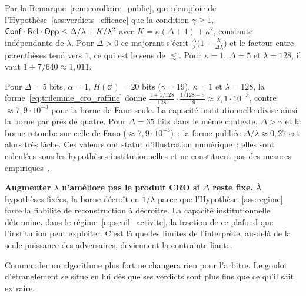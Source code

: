 \begin{sloppypar}
\begin{corollary}
\end{corollary}

\begin{Preuve}
Par la Remarque~\ref{rem:corollaire_publie}, qui n'emploie de
l'Hypoth\`ese~\ref{ass:verdicts_efficace} que la condition $\gamma \geq 1$,
$\mathsf{Conf} \cdot \mathsf{Rel} \cdot \mathsf{Opp} \leq \Delta/\lambda + K/\lambda^2$ avec
$K = \kappa(\Delta+1) + \kappa^2$, constante ind\'ependante de $\lambda$. Pour
$\Delta > 0$ ce majorant s'\'ecrit $\frac{\Delta}{\lambda}\bigl(1 + \frac{K}{\Delta\lambda}\bigr)$
et le facteur entre parenth\`eses tend vers $1$, ce qui est le sens de $\lesssim$.
Pour $\kappa = 1$, $\Delta = 5$ et $\lambda = 128$, il vaut
$1 + 7/640 \approx 1{,}011$.
\end{Preuve}

Pour $\Delta = 5$ bits, $\alpha = 1$, $H(\mathcal{C}) = 20$ bits
($\gamma = 19$), $\kappa = 1$ et $\lambda = 128$, la
forme~\eqref{eq:trilemme_cro_raffine} donne
$\frac{1+1/128}{128}\cdot\frac{1/128 + 5}{19} \approx 2{,}1\cdot10^{-3}$,
contre $\approx 7{,}9\cdot10^{-3}$ pour la borne de Fano seule. La capacit\'e
institutionnelle divise ainsi la borne par pr\`es de quatre. Pour $\Delta = 35$
bits dans le m\^eme contexte, $\Delta > \gamma$ et la borne retombe sur
celle de Fano ($\approx 7{,}9\cdot10^{-3}$)~; la forme publi\'ee
$\Delta/\lambda \approx 0{,}27$ est alors tr\`es l\^ache. Ces valeurs ont
statut d'illustration num\'erique~; elles sont calcul\'ees sous les hypoth\`eses
institutionnelles et ne constituent pas des mesures empiriques~\cite{Tsybakov2009}.

\textbf{Augmenter $\lambda$ n'am\'eliore pas le produit CRO si $\Delta$ reste fixe.}
\`A hypoth\`eses fix\'ees, la borne d\'ecro\^it en $1/\lambda$ parce que
l'Hypoth\`ese~\ref{ass:regime} force la fiabilit\'e de reconstruction \`a
d\'ecro\^itre. La capacit\'e institutionnelle d\'etermine, dans le
r\'egime~\eqref{eq:seuil_activite}, la fraction de ce plafond que
l'institution peut exploiter. C'est l\`a que les limites de l'interpr\`ete, au-del\`a
de la seule puissance des adversaires, deviennent la contrainte liante.

\begin{boiteArbitre}
Commander un algorithme plus fort ne changera rien pour l'arbitre.
Le goulot d'\'etranglement se situe en lui d\`es que ses verdicts
sont plus fins que ce qu'il sait extraire.
\end{boiteArbitre}

\begin{figure}[htbp]
\centering
\begin{tikzpicture}[
    scale=0.8,
    transform shape,
    every node/.style={font=\small}
]


\end{tikzpicture}
\end{figure}
\end{sloppypar}

